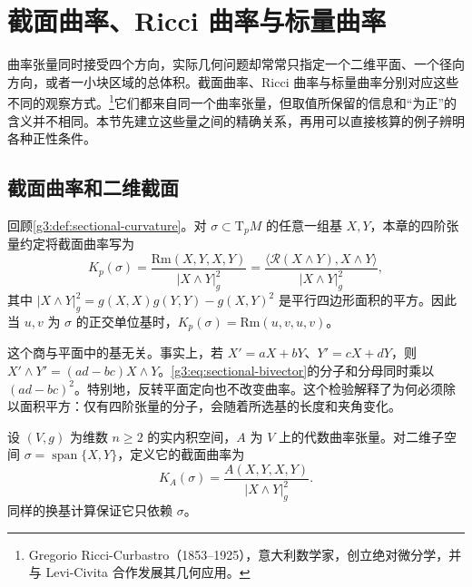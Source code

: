 
% 
% 

\section{截面曲率、Ricci 曲率与标量曲率}
\label{g3:sec:0302}

曲率张量同时接受四个方向，实际几何问题却常常只指定一个二维平面、一个径向方向，或者一小块区域的总体积。截面曲率、Ricci 曲率与标量曲率分别对应这些不同的观察方式。\footnote{Gregorio Ricci-Curbastro（1853--1925），意大利数学家，创立绝对微分学，并与 Levi-Civita 合作发展其几何应用。}它们都来自同一个曲率张量，但取值所保留的信息和“为正”的含义并不相同。本节先建立这些量之间的精确关系，再用可以直接核算的例子辨明各种正性条件。

\subsection{截面曲率和二维截面}
\label{g3:subsec:0302:01}

回顾\cref{g3:def:sectional-curvature}。对 \(\sigma\subset\mathrm{T}_pM\) 的任意一组基 \(X,Y\)，本章的四阶张量约定将截面曲率写为
\begin{equation}
	\label{g3:eq:sectional-bivector}
	K_p(\sigma)
	=\frac{\mathrm{Rm}(X,Y,X,Y)}{|X\wedge Y|_g^2}
	=\frac{\langle\mathcal R(X\wedge Y),X\wedge Y\rangle}{|X\wedge Y|_g^2},
\end{equation}
其中 \(|X\wedge Y|_g^2=g(X,X)g(Y,Y)-g(X,Y)^2\) 是平行四边形面积的平方。因此当 \(u,v\) 为 \(\sigma\) 的正交单位基时，\(K_p(\sigma)=\mathrm{Rm}(u,v,u,v)\)。

\ProseParagraphBreak

这个商与平面中的基无关。事实上，若 \(X'=aX+bY\)、\(Y'=cX+dY\)，则 \(X'\wedge Y'=(ad-bc)X\wedge Y\)。\eqref{g3:eq:sectional-bivector}的分子和分母同时乘以 \((ad-bc)^2\)。特别地，反转平面定向也不改变曲率。这个检验解释了为何必须除以面积平方：仅有四阶张量的分子，会随着所选基的长度和夹角变化。

\begin{definition}
	\label{g3:def:sectional-curvature-algebraic}
	设 \((V,g)\) 为维数 \(n\geq2\) 的实内积空间，\(A\) 为 \(V\) 上的代数曲率张量。对二维子空间 \(\sigma=\operatorname{span}\{X,Y\}\)，定义它的截面曲率为
	\[
		K_A(\sigma)=\frac{A(X,Y,X,Y)}{|X\wedge Y|_g^2}.
	\]
	同样的换基计算保证它只依赖 \(\sigma\)。
\end{definition}

